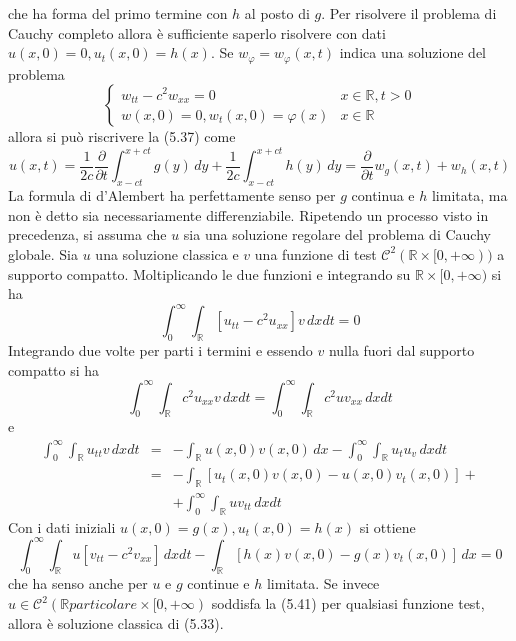 \documentclass[a4paper,12pt, draft]{article}
\theoremstyle{break}
\let\phi\varphi
\numberwithin{equation}{section}
\begin{document}
che ha forma del primo termine con \(h\) al posto di \(g\). Per risolvere il problema di Cauchy completo allora è sufficiente saperlo risolvere con dati \(u(x,0) = 0, u_t(x,0) = h(x)\). Se \(w_{\phi} = w_{\phi}(x,t)\) indica una soluzione del problema 
\begin{equation}
  \begin{cases}
    w_{tt} - c^2w_{xx} = 0 & x \in \mathbb{R}, t > 0 \\
    w(x,0) = 0, w_t(x,0) = \phi(x) & x \in \mathbb{R}
  \end{cases}
\end{equation}
allora si può riscrivere la (5.37) come
\[
u(x,t) = \frac{1}{2c}\frac{\partial}{\partial t} \int_{x-ct}^{x+ct} g(y) \, dy + \frac{1}{2c} \int_{x-ct}^{x+ct}h(y) \, dy = \frac{\partial}{\partial t} w_g(x,t) + w_h(x,t)  
\]
La formula di d'Alembert ha perfettamente senso per \(g\) continua e \(h\) limitata, ma non è detto sia necessariamente differenziabile. Ripetendo un processo visto in precedenza, si assuma che \(u\) sia una soluzione regolare del problema di Cauchy globale. Sia \(u\) una soluzione classica e \(v\) una funzione di test \(\mathcal{C}^2 (\mathbb{R} \times [0, +\infty))\) a supporto compatto. Moltiplicando le due funzioni e integrando su \(\mathbb{R} \times [0, +\infty)\) si ha 
\[
\int_0^{\infty}\int_{\mathbb{R}} [u_{tt} - c^2u_{xx}]v \, dxdt = 0  
\]
Integrando due volte per parti i termini e essendo \(v\) nulla fuori dal supporto compatto si ha
\[
 \int_0^{\infty} \int_{\mathbb{R}} c^2u_{xx} v \, dxdt = \int_0^{\infty}\int_{\mathbb{R}} c^2uv_{xx} \, dxdt
\]
e 
\[
  \begin{array}{lcl}
    \int_0^{\infty} \int_{\mathbb{R}} u_{tt} v \, dxdt & = & -\int_{\mathbb{R}} u(x,0)v(x,0) \, dx - \int_0^{\infty}\int_{\mathbb{R}}u_tu_v \, dxdt \\
    & = & - \int_{\mathbb{R}}[u_t(x,0)v(x,0) - u(x,0)v_t(x,0)] + \\
    & & +\int_0^{\infty}\int_{\mathbb{R}} uv_{tt} \, dxdt
  \end{array}
\]
Con i dati iniziali \(u(x,0) = g(x), u_t(x,0) = h(x)\) si ottiene 
\begin{equation}
  \int_0^{\infty} \int_{\mathbb{R}} u[v_{tt}- c^2v_{xx}] \, dxdt - \int_{\mathbb{R}} [h(x)v(x,0) - g(x)v_t(x,0)] \, dx = 0
\end{equation}
che ha senso anche per \(u \mbox{ e } g\) continue e \(h\) limitata. Se invece \(u \in \mathcal{C}^2(\mathbb{R} particolare\times [0, +\infty)\) soddisfa la (5.41) per qualsiasi funzione test, allora è soluzione classica di (5.33). 
\end{document}
